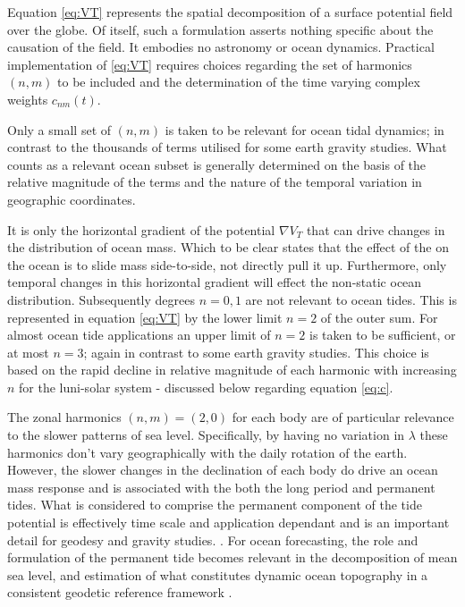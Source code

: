 Equation \ref{eq:VT} represents the spatial decomposition of a surface potential field over the globe.  Of itself, such a formulation asserts nothing specific about the causation of the field.  It embodies no astronomy or ocean dynamics.
Practical implementation of \ref{eq:VT} requires choices regarding the set of harmonics $(n,m)$ to be included and the determination of the time varying complex weights $c_{nm}(t)$.


Only a small set of $(n,m)$ is taken to be relevant for ocean tidal dynamics; in contrast to the thousands of terms utilised for some earth gravity studies. What counts as a relevant ocean subset is generally determined on the basis of the relative magnitude of the terms and the nature of the temporal variation in geographic coordinates.

It is only the horizontal gradient of the potential $\nabla V_T$ that can drive changes in the distribution of ocean mass.   Which to be clear states that the effect of the \ATGP{} on the ocean is to slide mass side-to-side, not directly pull it up.   Furthermore, only temporal changes in this horizontal gradient will effect the non-static ocean distribution. Subsequently degrees $n=0,1$ are not relevant to ocean tides.   This is represented in equation \ref{eq:VT} by the lower limit $n=2$ of the outer sum.
For almost ocean tide applications an upper limit of $n=2$ is taken to be sufficient, or at most $n=3$; again in contrast to some earth gravity studies.  This choice is based on the rapid decline in relative magnitude of each harmonic with increasing $n$ for the luni-solar system - discussed below regarding equation \ref{eq:c}.



The zonal harmonics $(n,m) = (2,0)$ for each body are of particular relevance to the slower patterns of sea level.  Specifically, by having no variation in $\lambda$ these harmonics don't vary geographically with the daily rotation of the earth.   However, the slower changes in the declination of each body do drive an ocean mass response and is associated with the both the long period and permanent tides.  
What is considered to comprise the permanent component of the tide potential is effectively time scale and application dependant and is an important detail for geodesy and gravity studies.  \citep[section 5.3.3.2]{Urban:2013vl}.  For ocean forecasting, the role and formulation of the permanent tide becomes relevant in the decomposition of mean sea level, and estimation of what constitutes dynamic ocean topography in a consistent geodetic reference framework \citep{Filmer:2018cu}\citep{10.1007/bf02520477}.


